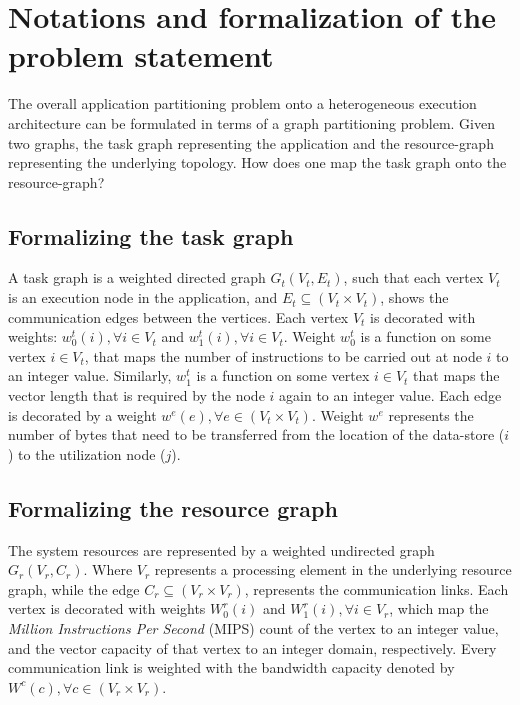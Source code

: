 \section{Notations and formalization of the problem statement}
\label{sec:relat-notat-form}

The overall application partitioning problem onto a heterogeneous
execution architecture can be formulated in terms of a graph
partitioning problem. Given two graphs, the task graph representing the
application and the resource-graph representing the underlying
topology. How does one map the task graph onto the resource-graph?


\subsection{Formalizing the task graph}
\label{sec:form-task-graph}

A task graph is a weighted directed graph $G_t(V_t,E_t)$, such that each
vertex $V_t$ is an execution node in the application, and \mbox{$E_t
  \subseteq (V_t \times V_t)$}, shows the communication edges between
the vertices. Each vertex $V_t$ is decorated with weights: $w^t_0(i),
\forall i \in V_t$ and $w^t_1(i), \forall i \in V_t$. Weight $w^t_0$ is
a function on some vertex $i \in V_t$, that maps the number of
instructions to be carried out at node $i$ to an integer
value. Similarly, $w^t_1$ is a function on some vertex $i \in V_t$ that
maps the vector length that is required by the node $i$ again to an
integer value. Each edge is decorated by a weight $w^e(e), \forall e \in
(V_t \times V_t)$. Weight $w^e$ represents the number of bytes that need
to be transferred from the location of the data-store ($i$) to the
utilization node ($j$).


\subsection{Formalizing the resource graph}
\label{sec:form-reso-graph}

The system resources are represented by a weighted undirected graph
$G_r(V_r,C_r)$. Where $V_r$ represents a processing element in the
underlying resource graph, while the edge $C_r \subseteq (V_r \times
V_r)$, represents the communication links. Each vertex is decorated with
weights $W^r_0(i)$ and $W^r_1(i), \forall i \in V_r$, which map the
\textit{Million Instructions Per Second} (MIPS) count of the vertex to
an integer value, and the vector capacity of that vertex to an integer
domain, respectively. Every communication link is weighted with the
bandwidth capacity denoted by $W^c(c), \forall c \in (V_r \times V_r)$.

